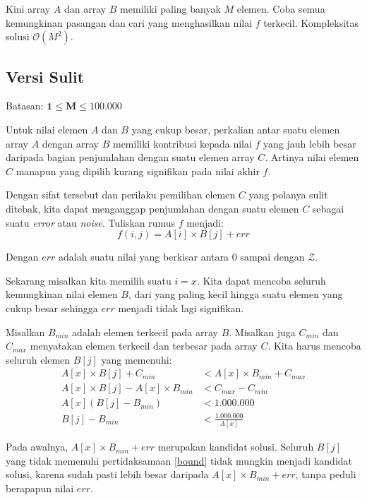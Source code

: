 \documentclass[../main_editorial.tex]{subfiles} %
\newcommand{\bigO}[1]{\mathcal{O}(#1)}
\newcommand{\maxValue}{\mathcal{Z}}
\begin{document}
Kini array $A$ dan array $B$ memiliki paling banyak $M$ elemen. Coba semua kemungkinan pasangan dan cari yang menghasilkan nilai $f$ terkecil. Kompleksitas solusi $\bigO{M^2}$.

\subsection*{Versi Sulit}
Batasan: $\mathbf{1 \le M \le 100.000}$

Untuk nilai elemen $A$ dan $B$ yang cukup besar, perkalian antar suatu elemen array $A$ dengan array $B$ memiliki kontribusi kepada nilai $f$ yang jauh lebih besar daripada bagian penjumlahan dengan suatu elemen array $C$. Artinya nilai elemen $C$ manapun yang dipilih kurang signifikan pada nilai akhir $f$.

Dengan sifat tersebut dan perilaku pemilihan elemen $C$ yang polanya sulit ditebak, kita dapat menganggap penjumlahan dengan suatu elemen $C$ sebagai suatu \textit{error} atau \textit{noise}. Tuliskan rumus $f$ menjadi:
$$f(i,j) = A[i] \times B[j] + err$$

Dengan $err$ adalah suatu nilai yang berkisar antara $0$ sampai dengan $\maxValue$.

Sekarang misalkan kita memilih suatu $i=x$. Kita dapat mencoba seluruh kemungkinan nilai elemen $B$, dari yang paling kecil hingga suatu elemen yang cukup besar sehingga $err$ menjadi tidak lagi signifikan. 

Misalkan $B_{min}$ adalah elemen terkecil pada array $B$. Misalkan juga $C_{min}$ dan $C_{max}$ menyatakan elemen terkecil dan terbesar pada array $C$. Kita harus mencoba seluruh elemen $B[j]$ yang memenuhi:
\begin{align}
A[x] \times B[j] + C_{min} &< A[x] \times B_{min} + C_{max} \nonumber \\
A[x] \times B[j] - A[x] \times B_{min} &< C_{max} - C_{min} \nonumber\\
A[x] (B[j] - B_{min}) &< 1.000.000 \nonumber \\
B[j] - B_{min} &< \frac{1.000.000}{A[x]} \label{bound}
\end{align}

Pada awalnya, $A[x] \times B_{min} + err$ merupakan kandidat solusi. Seluruh $B[j]$ yang tidak memenuhi pertidaksamaan \ref{bound} tidak mungkin menjadi kandidat solusi, karena sudah pasti lebih besar daripada $A[x] \times B_{min} + err$, tanpa peduli berapapun nilai $err$.
\end{document}
